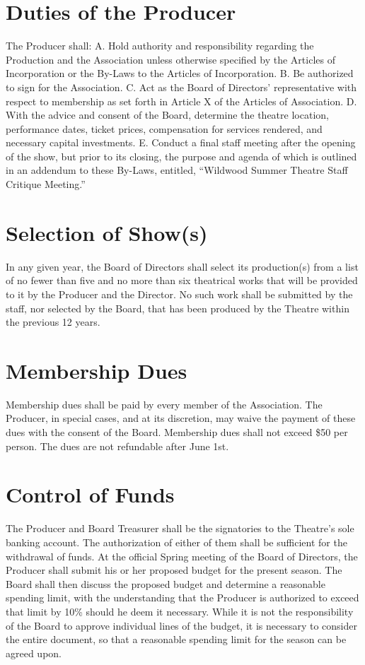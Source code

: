 \documentclass{wst}
\begin{document}
\section{Duties of the Producer}
The Producer shall:
A.	Hold authority and responsibility regarding the Production and the Association unless otherwise specified by the Articles of Incorporation or the By-Laws to the Articles of Incorporation.
B.     Be authorized to sign for the Association.
C.	Act as the Board of Directors' representative with respect to membership as set forth in Article X of the Articles of Association.
D.	With the advice and consent of the Board, determine the theatre location, performance dates, ticket prices, compensation for services rendered, and necessary capital investments.
E.	Conduct a final staff meeting after the opening of the show, but prior to its closing, the purpose and agenda of which is outlined in an addendum to these By-Laws, entitled, “Wildwood Summer Theatre Staff Critique Meeting.”

\section{Selection of Show(s)}
In any given year, the Board of Directors shall select its production(s) from a list of no fewer than five and no more than six theatrical works that will be provided to it by the Producer and the Director.  No such work shall be submitted by the staff, nor selected by the Board, that has been produced by the Theatre within the previous 12 years.

\section{Membership Dues}
Membership dues shall be paid by every member of the Association.  The Producer, in special cases, and at its discretion, may waive the payment of these dues with the consent of the Board.  Membership dues shall not exceed \$50 per person. The dues are not refundable after June 1st.

\section{Control of Funds}
\1 The Producer and Board Treasurer shall be the signatories to the Theatre's sole banking account.  The authorization of either of them shall be sufficient for the withdrawal of funds.
\1 At the official Spring meeting of the Board of Directors, the Producer shall submit his or her proposed budget for the present season.  The Board shall then discuss the proposed budget and determine a reasonable spending limit, with the understanding that the Producer is authorized to exceed that limit by 10\% should he deem it necessary.   While it is not the responsibility of the Board to approve individual lines of the budget, it is necessary to consider the entire document, so that a reasonable spending limit for the season can be agreed upon.
\end{document}
